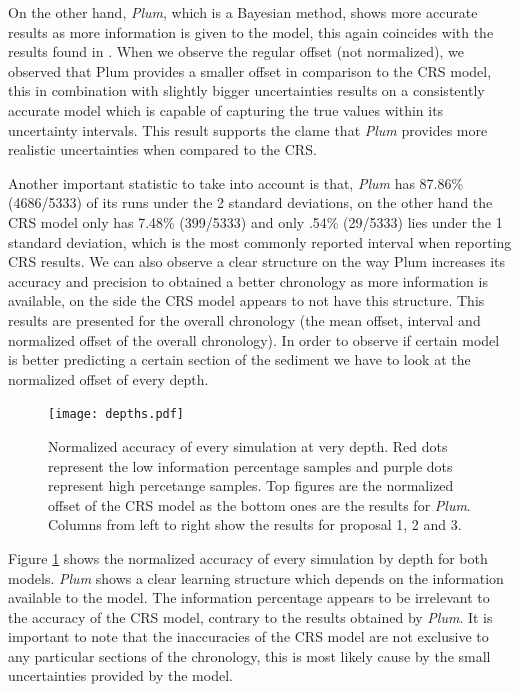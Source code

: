 \documentclass [10pt] {article}
\begin{document}
On the other hand, \textit{Plum}, which is a Bayesian method, shows more accurate results as more information is given to the model, this again coincides with the results found in \citet{Blaauw2018}. 
When we observe the regular offset (not normalized), we observed that Plum provides a smaller offset in comparison to the CRS model, this in combination with slightly bigger uncertainties results on a consistently accurate model which is capable of capturing the true values within its uncertainty intervals. 
This result supports the clame that \textit{Plum} provides more realistic uncertainties when compared to the CRS. 



	Another important statistic to take into account is that, \textit{Plum} has 87.86\% (4686/5333) of its runs under the 2 standard deviations, on the other hand the CRS model only has 7.48\% (399/5333) and only .54\% (29/5333) lies under the 1 standard deviation, which is the most commonly reported interval when reporting CRS results.
We can also observe a clear structure on the way Plum increases its accuracy and precision to obtained a better chronology as more information is available, on the side the CRS model appears to not have this structure. 
This results are presented for the overall chronology (the mean offset, interval and normalized offset of the overall chronology). In order to observe if certain model is better predicting a certain section of the sediment we  have to look at the normalized offset of every depth. 


\begin{figure}[!]
	\begin{centering}
		\texttt{[image: depths.pdf]}
		\caption{Normalized accuracy of every simulation at very depth. Red dots represent the low information percentage samples and purple dots represent high percetange samples. Top figures are the normalized offset of the CRS model as the bottom ones are the results for \textit{Plum}. Columns from left to right show the results for proposal 1, 2 and 3.}
		\label{fig:depths}
	\end{centering}
\end{figure}

Figure \ref{fig:depths} shows the normalized accuracy of every simulation by depth for both models.
\textit{Plum} shows a clear learning structure which depends on the information available to the model.
The information percentage appears to be irrelevant to the accuracy of the CRS model, contrary to the results obtained by \textit{Plum}.
It is important to note that the inaccuracies of the CRS model are not exclusive to any particular sections of the chronology, this is most likely cause by the small uncertainties provided by the model.  
\end{document}
